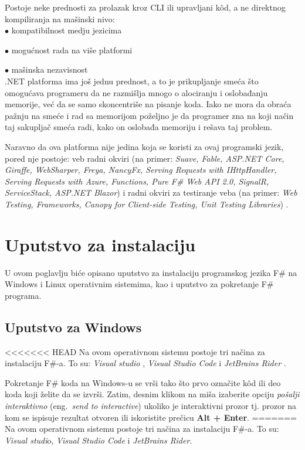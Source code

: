 \documentclass[a4paper]{article}
\begin{document}
Postoje neke prednosti za prolazak kroz CLI ili upravljani kôd, a ne direktnog kompiliranja na mašinski nivo:	\\

	$\bullet$ kompatibilnost medju jezicima
	
	$\bullet$ mogućnost rada na više platformi
	
	$\bullet$ mašinska nezavisnost
\\

.NET platforma ima još jednu prednost, a to je prikupljanje smeća što omogućava programeru da ne razmišlja mnogo o alociranju i oslobađanju memorije, već da se samo skoncentriše na pisanje koda. Iako ne mora da obraća pažnju na smeće i rad sa memorijom poželjno je da programer zna na koji način taj sakupljač smeća radi, kako on oslobađa memoriju i rešava taj problem.

Naravno da ova platforma nije jedina koja se koristi za ovaj programski jezik, pored nje postoje: veb radni okviri (na primer: {\em Suave, Fable, ASP.NET Core, Giraffe, WebSharper, Freya, NancyFx, Serving Requests with IHttpHandler, Serving Requests with Azure, Functions, Pure F\# Web API 2.0, SignalR, ServiceStack, ASP.NET Blazor}) i radni okviri za testiranje veba (na primer: {\em Web Testing, Frameworks, Canopy for Client-side Testing, Unit Testing Libraries}) \cite{fwFs}.

\section{Uputstvo za instalaciju}

U ovom poglavlju biće opisano uputstvo za instalaciju programskog jezika F\# na Windows i Linux operativnim sistemima, kao i uputstvo za pokretanje F\# programa.

\subsection{Uputstvo za Windows}

<<<<<<< HEAD
Na ovom operativnom sistemu postoje tri načina za instalaciju F\#-a. To su: {\em Visual studio} \cite{vStud}, {\em Visual Studio Code} \cite{vStudCode} i {\em JetBrains Rider} \cite{jetBrains}.

Pokretanje F\# koda na Windows-u se vrši tako što prvo označite kôd ili deo koda koji želite da se izvrši. Zatim, desnim klikom na miša izaberite opciju {\em pošalji interaktivno} (eng.~{\em send to interactive}) ukoliko je interaktivni prozor tj. prozor na kom se ispisuje rezultat otvoren ili iskoristite prečicu \textbf{Alt + Enter}.
=======
Na ovom operativnom sistemu postoje tri načina za instalaciju F\#-a. To su: {\em Visual studi}o\cite{vStud}, {\em Visual Studio Code}\cite{vStudCode} i {\em JetBrains Rider}\cite{jetBrains}.
\end{document}
